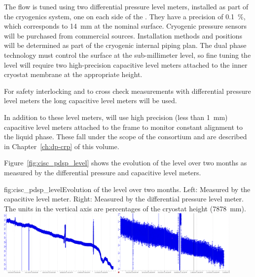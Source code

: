 The \lar flow is tuned using two differential pressure level meters, installed as part of the cryogenics system, one on each side of the .  They have a precision of \SI{0.1}{\%}, which corresponds to \SI{14}{mm} at the nominal  surface. Cryogenic pressure sensors will be purchased from commercial sources. Installation methods and positions will be determined as part of the cryogenic internal piping plan. 
The dual phase technology must control the  surface at the sub-millimeter level, so fine tuning the  level will require two high-precision capacitive level meters attached to the inner cryostat membrane at the appropriate height.   


For %
safety interlocking and to cross check measurements with differential pressure level meters the long capacitive level meters will be used. 


In addition to these level meters,  will use high precision (less than \SI{1}{mm}) capacitive level meters attached to the  frame to monitor constant  alignment to the liquid phase. These fall under the scope of the  consortium and are described in Chapter~\ref{ch:dp-crp} of this  volume.

Figure~\ref{fig:cisc_pdsp_level} shows the evolution of the   level over two months as measured by the differential pressure and capacitive level meters. 

\begin{dunefigure}{fig:cisc_pdsp_level}{Evolution of the  \lar level over two months. Left: Measured by the capacitive level meter. Right: Measured by the differential pressure level meter. The units in the vertical axis are percentages of the cryostat height (\SI{7878}{mm}).}
  \includegraphics[width=0.45\textwidth]{graphics/cisc_level_cap.png}%
  \hspace*{1cm}
  \includegraphics[width=0.45\textwidth]{graphics/cisc_level_diffp.png}%
\end{dunefigure}


